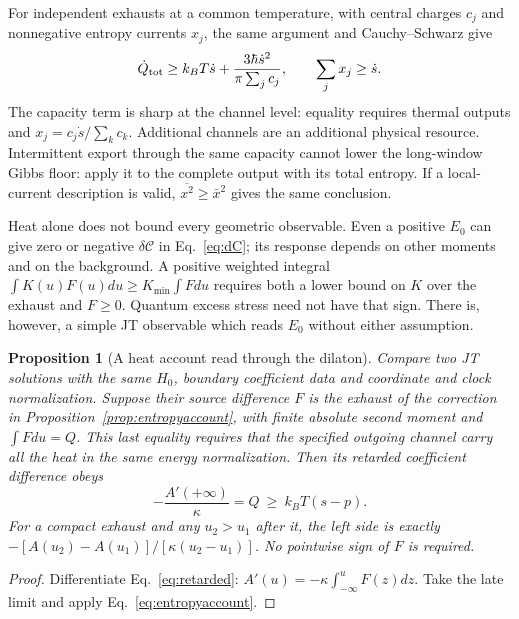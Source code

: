 \documentclass[12pt,a4paper]{article}
\newtheorem{proposition}[theorem]{Proposition}
\begin{document}
For independent exhausts at a common temperature, with central charges $c_j$
and nonnegative entropy currents $x_j$, the same argument and Cauchy--Schwarz give
\begin{equation}\label{eq:parallel-exhaust}
 \dot Q_{\rm tot}\ge k_BT\dot s+
 \frac{3\hbar\dot s^2}{\pi\sum_jc_j},\qquad \sum_jx_j\ge\dot s.
\end{equation}
The capacity term is sharp at the channel level: equality requires thermal outputs
and $x_j=c_j\dot s/\sum_kc_k$. Additional channels are an additional physical
resource. Intermittent export through the same capacity cannot lower the
long-window Gibbs floor: apply it to the complete output with its total entropy.
If a local-current description is valid, $\overline{x^2}\ge\bar x^2$ gives the
same conclusion.

Heat alone does not bound every geometric observable. Even a positive $E_0$ can
give zero or negative $\delta\mathcal C$ in Eq.~\eqref{eq:dC}; its response depends
on other moments and on the background. A positive weighted integral
$\int K(u)F(u)du\ge K_{\min}\int Fdu$ requires both a lower bound on $K$ over
the exhaust and $F\ge0$. Quantum excess stress need not have that sign. There is,
however, a simple JT observable which reads $E_0$ without either assumption.

\begin{proposition}[A heat account read through the dilaton]\label{prop:heatslope}
Compare two JT solutions with the same $H_0$, boundary coefficient data and
coordinate and clock normalization. Suppose their source difference $F$ is the
exhaust of the correction in Proposition~\ref{prop:entropyaccount}, with finite
absolute second moment and $\int Fdu=Q$. This last equality requires that the
specified outgoing channel carry all the heat in the same energy normalization.
Then its retarded coefficient difference obeys
\begin{equation}
 -\frac{A'(+\infty)}\kappa=Q\ \ge\ k_BT(s-p).
 \label{eq:heatslope}
\end{equation}
For a compact exhaust and any $u_2>u_1$ after it, the left side is exactly
$-[A(u_2)-A(u_1)]/[\kappa(u_2-u_1)]$. No pointwise sign of $F$ is required.
\end{proposition}
\begin{proof}
Differentiate Eq.~\eqref{eq:retarded}: $A'(u)=-\kappa\int_{-\infty}^uF(z)dz$.
Take the late limit and apply Eq.~\eqref{eq:entropyaccount}.
\end{proof}
\end{document}
